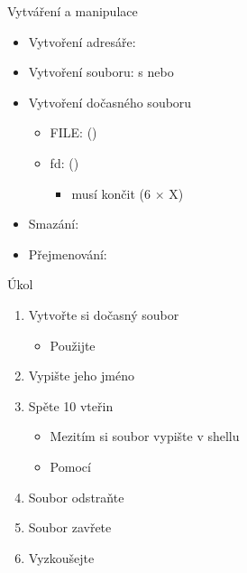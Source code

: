 \begin{frame}{Vytváření a manipulace}

 \begin{itemize}
   \item Vytvoření adresáře: 
   \item Vytvoření souboru:  s  nebo 

   \pause

   \item Vytvoření dočasného souboru
   \begin{itemize}
     \item FILE:  ()
     \item fd:  ()
     \begin{itemize}
       \item {} musí končit  (6 $\times$ X)
     \end{itemize}
   \end{itemize}

   \pause

   \item Smazání: 

   \pause

   \item Přejmenování: 
 \end{itemize}

\end{frame}

\begin{frame}{Úkol}

  \begin{enumerate}
    \item Vytvořte si dočasný soubor
    \begin{itemize}
      \item Použijte 
    \end{itemize}

    \item Vypište jeho jméno
    \item Spěte 10 vteřin
    \begin{itemize}
      \item Mezitím si soubor vypište v shellu
      \item Pomocí 
    \end{itemize}

    \item Soubor odstraňte
    \item Soubor zavřete
    \item Vyzkoušejte
  \end{enumerate}

\end{frame}

